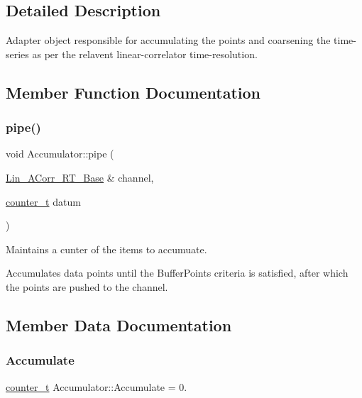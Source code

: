 \subsection{Detailed Description}
Adapter object responsible for accumulating the points and coarsening the time-\/series as per the relavent linear-\/correlator time-\/resolution. 

\subsection{Member Function Documentation}
\mbox{\label{classAccumulator_aa1793bc1599bc2451fabc44954673164}} 
\subsubsection{\texorpdfstring{pipe()}{pipe()}}
{\footnotesize\ttfamily void Accumulator\+::pipe (\begin{DoxyParamCaption}\item[{\hyperlink{classLin__ACorr__RT__Base}{Lin\+\_\+\+A\+Corr\+\_\+\+R\+T\+\_\+\+Base} \&}]{channel,  }\item[{\hyperlink{types_8hpp_ac89ac912f524b3e3fa3720ea55fec966}{counter\+\_\+t}}]{datum }\end{DoxyParamCaption})\hspace{0.3cm}{\ttfamily [inline]}}



Maintains a cunter of the items to accumuate. 

Accumulates data points until the Buffer\+Points criteria is satisfied, after which the points are pushed to the channel. 

\subsection{Member Data Documentation}
\mbox{\label{classAccumulator_a8e615af8b85dd2c8500d1f8c473879ab}} 
\subsubsection{\texorpdfstring{Accumulate}{Accumulate}}
{\footnotesize\ttfamily \hyperlink{types_8hpp_ac89ac912f524b3e3fa3720ea55fec966}{counter\+\_\+t} Accumulator\+::\+Accumulate = 0.\hspace{0.3cm}{\ttfamily [private]}}



